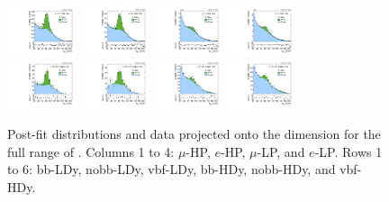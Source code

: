 \begin{figure}[htbp]
  \includegraphics[width=0.18\textwidth]{fig/fitValidation/PostFit_SR_MJJ__mu_HP_nobb_HDy_Run2.pdf}
  \includegraphics[width=0.18\textwidth]{fig/fitValidation/PostFit_SR_MJJ__e_HP_nobb_HDy_Run2.pdf}
  \includegraphics[width=0.18\textwidth]{fig/fitValidation/PostFit_SR_MJJ__mu_LP_nobb_HDy_Run2.pdf}
  \includegraphics[width=0.18\textwidth]{fig/fitValidation/PostFit_SR_MJJ__e_LP_nobb_HDy_Run2.pdf}\\
  \includegraphics[width=0.18\textwidth]{fig/fitValidation/PostFit_SR_MJJ__mu_HP_vbf_HDy_Run2.pdf}
  \includegraphics[width=0.18\textwidth]{fig/fitValidation/PostFit_SR_MJJ__e_HP_vbf_HDy_Run2.pdf}
  \includegraphics[width=0.18\textwidth]{fig/fitValidation/PostFit_SR_MJJ__mu_LP_vbf_HDy_Run2.pdf}
  \includegraphics[width=0.18\textwidth]{fig/fitValidation/PostFit_SR_MJJ__e_LP_vbf_HDy_Run2.pdf}\\
  \caption{
    Post-fit distributions and data projected onto the \MJ dimension for the full range of \MVV.
    Columns 1 to 4: $\mu$-HP, $e$-HP, $\mu$-LP, and $e$-LP.
    Rows 1 to 6: bb-LDy, nobb-LDy, vbf-LDy, bb-HDy, nobb-HDy, and vbf-HDy.
  }
  \label{fig:postfit_MJJ_Run2}
\end{figure}

